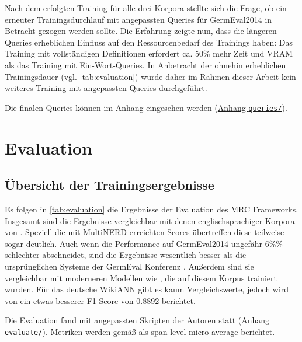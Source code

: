 Nach dem erfolgten Training für alle drei Korpora stellte sich die Frage, ob ein erneuter Trainingsdurchlauf mit angepassten Queries für GermEval2014 in Betracht gezogen werden sollte. Die Erfahrung zeigte nun, dass die längeren Queries erheblichen Einfluss auf den Ressourcenbedarf des Trainings haben: Das Training mit vollständigen Definitionen erfordert ca. 50\% mehr Zeit und VRAM als das Training mit Ein-Wort-Queries. In Anbetracht der ohnehin erheblichen Trainingsdauer (vgl. \autoref{tab:evaluation}) wurde daher im Rahmen dieser Arbeit kein weiteres Training mit angepassten Queries durchgeführt.

Die finalen Queries können im Anhang eingesehen werden (\hyperref[app:queries]{Anhang \texttt{queries/}}).


\chapter{Evaluation}
\label{ch:Evaluation}

\section{Übersicht der Trainingsergebnisse}
\label{ch:Evaluation:sec:Übersicht_der_Trainingsergebnisse}

Es folgen in \autoref{tab:evaluation} die Ergebnisse der Evaluation des MRC Frameworks. Insgesamt sind die Ergebnisse vergleichbar mit denen englischsprachiger Korpora von . Speziell die mit MultiNERD erreichten Scores übertreffen diese teilweise sogar deutlich. Auch wenn die Performance auf GermEval2014 ungefähr 6\%\% schlechter abschneidet, sind die Ergebnisse wesentlich besser als die ursprünglichen Systeme der GermEval Konferenz \parencite{germeval2014}. Außerdem sind sie vergleichbar mit moderneren Modellen wie \cite{riedl-pado-shootout}, die auf diesem Korpus trainiert wurden. Für das deutsche WikiANN gibt es kaum Vergleichswerte, jedoch wird von \cite{Schiesser_2023} ein etwas besserer F1-Score von 0.8892 berichtet.

Die Evaluation fand mit angepassten Skripten der Autoren statt (\hyperref[app:evaluate]{Anhang \texttt{evaluate/}}). Metriken werden gemäß \cite{li2019unified} als span-level micro-average berichtet.


